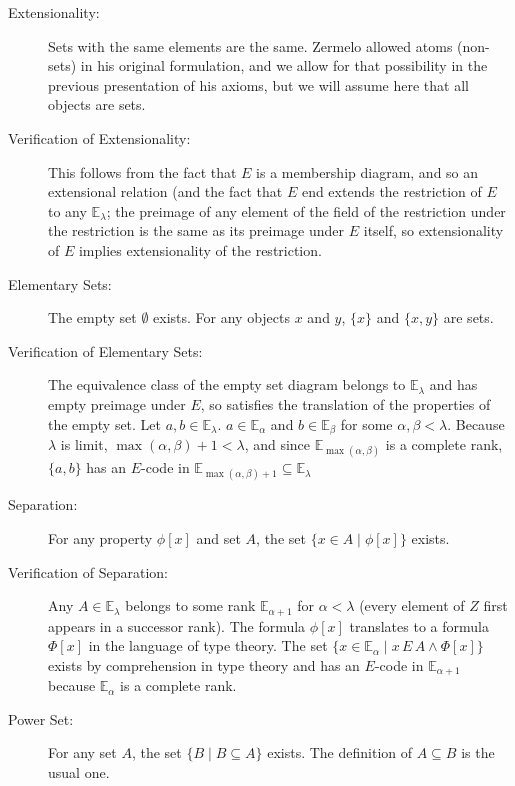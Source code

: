 \documentclass[12pt]{book}
\begin{document}
\begin{description}

\item[Extensionality:] Sets with the same elements are the same.  Zermelo allowed atoms (non-sets) in his original
formulation, and we allow for that possibility in the previous presentation of his axioms, but we will assume here that all objects are sets.

\item[Verification of Extensionality:] This follows from the fact that
$E$ is a membership diagram, and so an extensional relation (and the
fact that $E$ end extends the restriction of $E$ to any ${\mathbb
E}_{\lambda}$; the preimage of any element of the field of the
restriction under the restriction is the same as its preimage under
$E$ itself, so extensionality of $E$ implies extensionality of the
restriction.

\item[Elementary Sets:] The empty set $\emptyset$ exists.  For any
objects $x$ and $y$, $\{x\}$ and $\{x,y\}$ are sets.

\item[Verification of Elementary Sets:] The equivalence class of the
empty set diagram belongs to ${\mathbb E}_{\lambda}$ and has empty
preimage under $E$, so satisfies the translation of the properties of
the empty set.  Let $a, b \in {\mathbb E}_{\lambda}$.  $a \in {\mathbb
E}_{\alpha}$ and $b \in {\mathbb E}_{\beta}$ for some $\alpha,\beta <
\lambda$.  Because $\lambda$ is limit, $\max(\alpha,\beta)+1 <
\lambda$, and since ${\mathbb E}_{\max(\alpha,\beta)}$ is a complete
rank, $\{a,b\}$ has an $E$-code in ${\mathbb E}_{\max(\alpha,\beta)+1}
\subseteq {\mathbb E}_{\lambda}$

\item[Separation:] For any property $\phi[x]$ and set $A$, the set $\{x
\in A \mid \phi[x]\}$ exists.

\item[Verification of Separation:] Any $A\in {\mathbb E}_{\lambda}$
belongs to some rank ${\mathbb E}_{\alpha+1}$ for $\alpha<\lambda$
(every element of $Z$ first appears in a successor rank).  The formula
$\phi[x]$ translates to a formula $\Phi[x]$ in the language of type
theory.  The set $\{x \in {\mathbb E}_{\alpha} \mid x \,E\, A \wedge
\Phi[x]\}$ exists by comprehension in type theory and has an $E$-code
in ${\mathbb E}_{\alpha+1}$ because ${\mathbb E}_{\alpha}$ is a
complete rank.

\item[Power Set:] For any set $A$, the set $\{B \mid B \subseteq A\}$
exists.  The definition of $A \subseteq B$ is the usual one.


\end{description}
\end{document}
